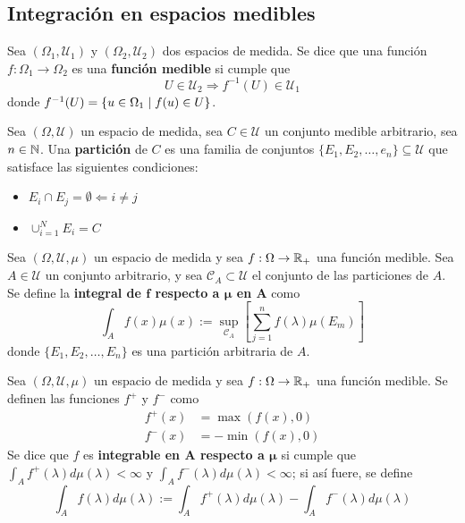 \subsection{Integración en espacios medibles}

\begin{definicion}
Sea $(\Omega_1, \mathcal{U}_1)$ y $(\Omega_2, \mathcal{U}_2)$ dos espacios de medida. Se dice que una función $f:\Omega_1\rightarrow\Omega_2$ es una \textbf{función medible} si cumple que
\begin{equation}
U \in \mathcal{U}_2 \Rightarrow f^{-1}(U) \in \mathcal{U}_1 
\end{equation}
donde $f^{-1}(U) = \left\{ u\in \Omega_1 \mathrel{}\middle|\mathrel{} f(u) \in U \right\}$.
\end{definicion}

\begin{definicion}
Sea $(\Omega, \mathcal{U})$ un espacio de medida, sea $C \in \mathcal{U}$ un conjunto medible arbitrario, sea $n\in \mathbb{N}$. Una \textbf{partición} de $C$ es una familia de conjuntos $\{E_1, E_2, \dots, e_n\} \subseteq\mathcal{U}$ que satisface las siguientes condiciones:
\begin{itemize}
\item $E_i \cap E_j = \emptyset \Leftarrow i\neq j $
\item $\cup_{i=1}^{N}  E_i = C $
\end{itemize}
\end{definicion}

\begin{definicion}
Sea $(\Omega, \mathcal{U}, \mu)$ un espacio de medida y sea $f:\Omega \rightarrow \mathbb{R}_+$ una función medible. Sea $A\in \mathcal{U}$ un conjunto arbitrario, y sea $\mathcal{C}_A \subset \mathcal{U}$ el conjunto de las particiones de $A$.
Se define la \textbf{integral de $\boldsymbol{f}$ respecto a $\boldsymbol{\mu}$ en $\boldsymbol{A}$} como
\begin{equation}
\int_A f(x) \mu(x) := \sup_{\mathcal{C}_A} \left[ \sum_{j=1}^{n} f(\lambda) \mu(E_m) \right]
\end{equation}
donde $\{ E_1, E_2, \dots, E_n \}$ es una partición arbitraria de $A$.
\end{definicion}

\begin{definicion}
Sea $(\Omega, \mathcal{U}, \mu)$ un espacio de medida y sea $f:\Omega \rightarrow \mathbb{R}_+$ una función medible. Se definen las funciones $f^{+}$ y $f^{-}$ como
\begin{align*}
f^{+}(x) &= \max (f(x), 0 ) \\
f^{-}(x) &= -\min (f(x), 0 )
\end{align*}
Se dice que $f$ es \textbf{integrable en $\boldsymbol{A}$ respecto a $\boldsymbol{\mu}$} si cumple que $\int_A f^{+}(\lambda) d\mu(\lambda) < \infty$ y $\int_A f^{-}(\lambda) d\mu(\lambda) < \infty$; si así fuere, se define
\begin{equation}
\int_A f(\lambda) d\mu(\lambda) := \int_A f^{+}(\lambda) d\mu(\lambda) - \int_A f^{-}(\lambda) d\mu(\lambda)
\end{equation}
\end{definicion}

